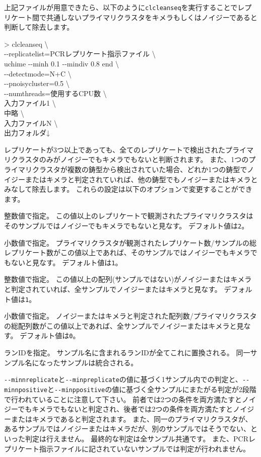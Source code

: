 \documentclass[titlepage,10pt,a4paper]{jsbook}
\newenvironment{cmd}{\begin{oframed}\raggedright\ttfamily\footnotesize\setlength{\baselineskip}{1.4em}}{\end{oframed}\vspace{-1em}}
\begin{document}
上記ファイルが用意できたら、以下のように\texttt{clcleanseq}を実行することでレプリケート間で共通しないプライマリクラスタをキメラもしくはノイジーであると判断して除去します。
\begin{cmd}
{\textgreater} clcleanseq {\textbackslash}\\
{-}{-}replicatelist=PCRレプリケート指示ファイル {\textbackslash}\\
uchime {-}{-}minh 0.1 {-}{-}mindiv 0.8 end {\textbackslash}\\
{-}{-}detectmode=N+C {\textbackslash}\\
{-}{-}pnoisycluster=0.5 {\textbackslash}\\
{-}{-}numthreads=使用するCPU数 {\textbackslash}\\
入力ファイル1 {\textbackslash}\\
中略 {\textbackslash}\\
入力ファイルN {\textbackslash}\\
出力フォルダ↓
\end{cmd}
レプリケートが3つ以上であっても、全てのレプリケートで検出されたプライマリクラスタのみがノイジーでもキメラでもないと判断されます。
また、1つのプライマリクラスタが複数の鋳型から検出されていた場合、どれか1つの鋳型でノイジーまたはキメラと判定されていれば、他の鋳型でもノイジーまたはキメラとみなして除去します。
これらの設定は以下のオプションで変更することができます。
\begin{description}\small\setlength{\baselineskip}{1.1em}
\item[\texttt{{-}{-}minnreplicate}] 整数値で指定。
この値以上のレプリケートで観測されたプライマリクラスタはそのサンプルではノイジーでもキメラでもないと見なす。
デフォルト値は\texttt{2}。
\item[\texttt{{-}{-}minpreplicate}] 小数値で指定。
プライマリクラスタが観測されたレプリケート数/サンプルの総レプリケート数がこの値以上であれば、そのサンプルではノイジーでもキメラでもないと見なす。
デフォルト値は\texttt{1}。
\item[\texttt{{-}{-}minnpositive}] 整数値で指定。
この値以上の配列(サンプルではない)がノイジーまたはキメラと判定されていれば、全サンプルでノイジーまたはキメラと見なす。
デフォルト値は\texttt{1}。
\item[\texttt{{-}{-}minppositive}] 小数値で指定。
ノイジーまたはキメラと判定された配列数/プライマリクラスタの総配列数がこの値以上であれば、全サンプルでノイジーまたはキメラと見なす。
デフォルト値は\texttt{0}。
\item[\texttt{{-}{-}runname}] ランIDを指定。
サンプル名に含まれるランIDが全てこれに置換される。
同一サンプル名になったサンプルは統合される。
\end{description}
\texttt{{-}{-}minnreplicate}と\texttt{{-}{-}minpreplicate}の値に基づく1サンプル内での判定と、\texttt{{-}{-}minnpositive}と\texttt{{-}{-}minppositive}の値に基づく全サンプルにまたがる判定が2段階で行われていることに注意して下さい。
前者では2つの条件を両方満たすとノイジーでもキメラでもないと判定され、後者では2つの条件を両方満たすとノイジーまたはキメラであると判定されます。
また、同一のプライマリクラスタが、あるサンプルではノイジーまたはキメラだが、別のサンプルではそうでない、といった判定は行えません。
最終的な判定は全サンプル共通です。
また、PCRレプリケート指示ファイルに記されていないサンプルでは判定が行われません。
\end{document}

